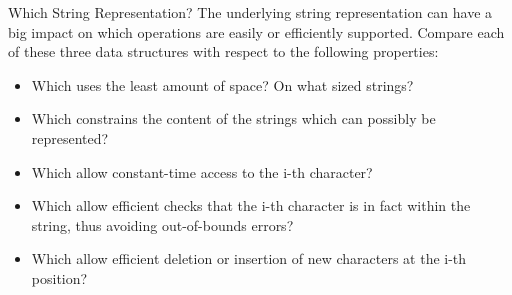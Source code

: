 \documentclass{beamer}
\begin{document}
\begin{frame}{Which String Representation?}
The underlying string representation can have a big impact
on which operations are easily or efficiently supported.
Compare each of these three data structures with respect to
the following properties:

\begin{itemize}
\item Which uses the least amount of space? On what sized strings?
\item Which constrains the content of the strings which can possibly be represented?
\item Which allow constant-time access to the i-th character?
\item Which allow efficient checks that the i-th character is in fact within the string, thus avoiding out-of-bounds errors?
\item Which allow efficient deletion or insertion of new characters at the i-th position?
\end{itemize}

\end{frame}




\end{document}

